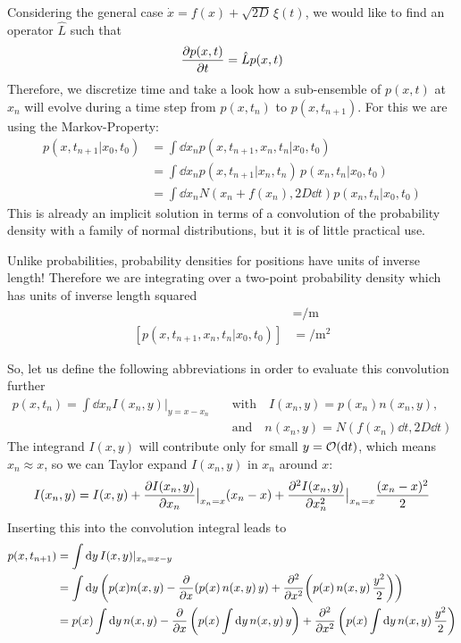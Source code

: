 \documentclass{notebook}
\begin{document}
Considering the general case $\dot{x} = f(x) + \sqrt{2D} \, \xi(t)$, we would like to find an operator $\hat{L}$ such that
%
\begin{equation}
\pdv{p(x,t)}{t} = \hat{L} p(x,t)
\end{equation}
%
Therefore, we discretize time and take a look how a sub-ensemble of $p(x,t)$ at $x_n$ will evolve during a time step from $p(x,t_n)$ to $p(x,t_{n+1})$. For this we are using the Markov-Property: 
%
\begin{align*}
	p(x,t_{n+1}|x_0,t_0) &= \int{\dd{x}_n p(x,t_{n+1},x_n,t_n|x_0,t_0)} \\
	&= \int{\dd{x}_n p(x,t_{n+1}|x_n,t_n)} \, p(x_n,t_n|x_0,t_0) \\
	&= \int{\dd{x}_n N(x_n+f(x_n), 2D \dd{t}) p(x_n,t_n|x_0,t_0)}
\end{align*}
%
This is already an implicit solution in terms of a convolution of the probability density with a family of normal distributions, but it is of little practical use. 
%
\begin{remark}
	Unlike probabilities, probability densities for positions have units of inverse length! Therefore we are integrating over a two-point probability density which has units of inverse length squared
	\begin{align*}
		[p(x,t_{n+1}|x_0,t_0)] &= \si{\per \meter} \\
		[p(x,t_{n+1},x_n,t_n|x_0,t_0)] &= \si{\per \meter \squared}
	\end{align*}
\end{remark}
%
So, let us define the following abbreviations in order to evaluate this convolution further 
%
\begin{align*}
	p(x,t_n) = \int \dd x_n I(x_n, y) |_{y = x-x_n} \quad &\mathrm{with} \quad I(x_n,y) = p(x_n) n(x_n,y), \\ 
	&\mathrm{and} \quad n(x_n,y) = N(f(x_n) \dd t, 2 D \dd t)
\end{align*}
%
The integrand $I(x,y)$ will contribute only for small $y = \mathcal{O}(\dd t)$, which means $x_n \approx x$, so we can Taylor expand $I(x_n,y)$ in $x_n$ around $x$:
%
\begin{equation}
I(x_n,y) = I(x,y) + \pdv{I(x_n,y)}{x_n} \big|_{x_n = x} (x_n-x) + \pdv[2]{I(x_n,y)}{x_n} \big|_{x_n = x} \frac{(x_n-x)^2}{2}
\end{equation}
%
Inserting this into the convolution integral leads to
%
\begin{align*}
	p(x,t_{n+1}) &= \int{\dd{y} I(x,y)|_{x_n = x-y}} \\
	&= \int\dd y \left( p(x) n(x,y) - \pdv{x} (p(x) \, n(x,y) \, y ) + \pdv[2]{x} (p(x) \, n(x,y) \, \frac{y^2}{2})\right) \\
	&= p(x) \int \dd{y} n(x,y) - \pdv{x} \left(p(x) \int \dd{y} n(x,y) \, y \right) + \pdv[2]{x} \left(p(x) \int \dd{y} n(x,y) \, \frac{y^2}{2} \right)
\end{align*}
\end{document}
